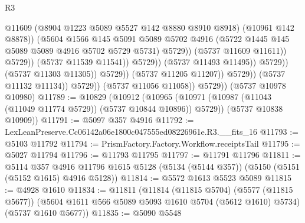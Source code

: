 \begin{lexlean}{R3}
\begin{coremodule}
                                                  @11609
                                                  (@8904 @1223 @5089 @5527 @142 @8880 @8910 @8918)
                                                  (@10961 @142 @8878))
                                                (@5604
                                                  @1566
                                                  @145
                                                  @5091
                                                  @5089
                                                  @5702
                                                  @4916
                                                  (@5722
                                                    @1445
                                                    @145
                                                    @5089
                                                    @5089
                                                    @4916
                                                    @5702
                                                    @5729
                                                    @5731)
                                                  @5729))
                                              (@5737 @11609 @11611))
                                            @5729))
                                        (@5737 @11539 @11541))
                                      @5729))
                                  (@5737 @11493 @11495))
                                @5729))
                            (@5737 @11303 @11305))
                          @5729))
                      (@5737 @11205 @11207))
                    @5729))
                (@5737 @11132 @11134))
              @5729))
          (@5737 @11056 @11058))
        @5729))
    (@5737 @10978 @10980)
@11789 := @10829
    (@10912
      (@10965 (@10971 (@10987 (@11043 (@11049 @11774 @5729)) (@5737 @10844 @10896)) @5729))
      (@5737 @10838 @10909))
@11791 := @5097 @357 @4916
@11792 := LexLeanPreserve.Cc06142a06e1800c047555ed08226961e.R3.__fits_16
@11793 := @5103 @11792
@11794 := PrismFactory.Factory.Workflow.receiptsTail
@11795 := @5027 @11794
@11796 := @11793 @11795
@11797 := @11791 @11796
@11811 := @5114
    @357
    @4916
    @11796
    @1615
    @5128
    (@5134 (@5144 @357))
    (@5150 (@5151 (@5152 @1615) @4916 @5128))
@11814 := @5572 @1613 @5523 @5089
@11815 := @4928 @1610
@11834 := @11811
    (@11814
      (@11815 @5704)
      (@5577 (@11815 @5677))
      (@5604 @1611 @566 @5089 @5093 @1610 @5704 (@5612 @1610) @5734)
      (@5737 @1610 @5677))
@11835 := @5090 @5548

\end{coremodule}
\end{lexlean}
